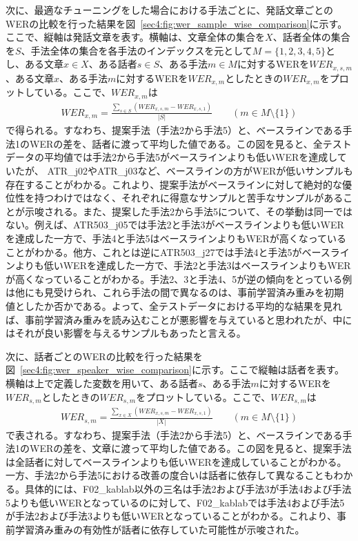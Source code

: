 \documentclass[12pt]{jarticle}
\numberwithin{equation}{section}    %
\numberwithin{figure}{section}      %
\numberwithin{table}{section}      %
\begin{document}
次に、最適なチューニングをした場合における手法ごとに、発話文章ごとのWERの比較を行った結果を図~\ref{sec4:fig:wer_sample_wise_comparison}に示す。ここで、縦軸は発話文章を表す。横軸は、文章全体の集合を$X$、話者全体の集合を$S$、手法全体の集合を各手法のインデックスを元として$M = \{1, 2, 3, 4, 5\}$とし、ある文章$x \in X$、ある話者$s \in S$、ある手法$m \in M$に対するWERを$WER_{x, s, m}$、ある文章$x$、ある手法$m$に対するWERを$WER_{x, m}$としたときの$WER_{x, m}$をプロットしている。ここで、$WER_{x, m}$は
\begin{align}
    WER_{x, m} = \frac{\sum_{s \in S} (WER_{x, s, m} - WER_{x, s, 1})}{|S|} \qquad (m \in M \setminus \{1\})
\end{align}
で得られる。すなわち、提案手法（手法2から手法5）と、ベースラインである手法1のWERの差を、話者に渡って平均した値である。この図を見ると、全テストデータの平均値では手法2から手法5がベースラインよりも低いWERを達成していたが、
ATR\_j02やATR\_j03など、ベースラインの方がWERが低いサンプルも存在することがわかる。これより、提案手法がベースラインに対して絶対的な優位性を持つわけではなく、それぞれに得意なサンプルと苦手なサンプルがあることが示唆される。また、提案した手法2から手法5について、その挙動は同一ではない。例えば、ATR503\_j05では手法2と手法3がベースラインよりも低いWERを達成した一方で、手法4と手法5はベースラインよりもWERが高くなっていることがわかる。他方、これとは逆にATR503\_j27では手法4と手法5がベースラインよりも低いWERを達成した一方で、手法2と手法3はベースラインよりもWERが高くなっていることがわかる。手法2、3と手法4、5が逆の傾向をとっている例は他にも見受けられ、これら手法の間で異なるのは、事前学習済み重みを初期値としたか否かである。よって、全テストデータにおける平均的な結果を見れば、事前学習済み重みを読み込むことが悪影響を与えていると思われたが、中にはそれが良い影響を与えるサンプルもあったと言える。

次に、話者ごとのWERの比較を行った結果を図~\ref{sec4:fig:wer_speaker_wise_comparison}に示す。ここで縦軸は話者を表す。横軸は上で定義した変数を用いて、ある話者$s$、ある手法$m$に対するWERを$WER_{s, m}$としたときの$WER_{s, m}$をプロットしている。ここで、$WER_{s, m}$は
\begin{align}
    WER_{s, m} = \frac{\sum_{x \in X} (WER_{x, s, m} - WER_{x, s, 1})}{|X|} \qquad (m \in M \setminus \{1\})
\end{align}
で表される。すなわち、提案手法（手法2から手法5）と、ベースラインである手法1のWERの差を、文章に渡って平均した値である。この図を見ると、提案手法は全話者に対してベースラインよりも低いWERを達成していることがわかる。一方、手法2から手法5における改善の度合いは話者に依存して異なることもわかる。具体的には、F02\_kablab以外の三名は手法2および手法3が手法4および手法5よりも低いWERとなっているのに対して、F02\_kablabでは手法4および手法5が手法2および手法3よりも低いWERとなっていることがわかる。これより、事前学習済み重みの有効性が話者に依存していた可能性が示唆された。
\end{document}
